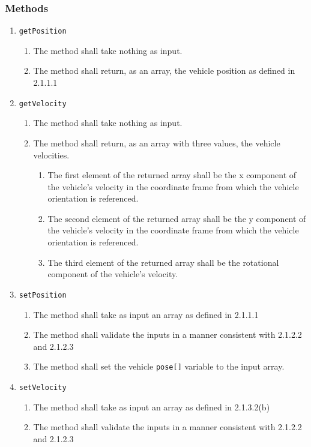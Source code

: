 \documentclass{article}
\begin{document}
\subsubsection{Methods}
\begin{enumerate}
	\item \verb|getPosition|
	\begin{enumerate}
		\item The method shall take nothing as input.
		\item The method shall return, as an array, the vehicle position as defined in 2.1.1.1
	\end{enumerate}
	\item \verb|getVelocity|
	\begin{enumerate}
		\item The method shall take nothing as input.
		\item The method shall return, as an array with three values, the vehicle velocities.
		\begin{enumerate}
			\item The first element of the returned array shall be the x component of the vehicle's velocity in the coordinate frame from which the vehicle orientation is referenced.
			\item The second element of the returned array shall be the y component of the vehicle's velocity in the coordinate frame from which the vehicle orientation is referenced.
			\item The third element of the returned array shall be the rotational component of the vehicle's velocity.
		\end{enumerate}
	\end{enumerate}
	\item \verb|setPosition|
	\begin{enumerate}
		\item The method shall take as input an array as defined in 2.1.1.1
		\item The method shall validate the inputs in a manner consistent with 2.1.2.2 and 2.1.2.3
		\item The method shall set the vehicle \verb|pose[]| variable to the input array.
	\end{enumerate}
	\item \verb|setVelocity|
	\begin{enumerate}
		\item The method shall take as input an array as defined in 2.1.3.2(b)
		\item The method shall validate the inputs in a manner consistent with 2.1.2.2 and 2.1.2.3

\end{enumerate}
\end{enumerate}
\end{document}
